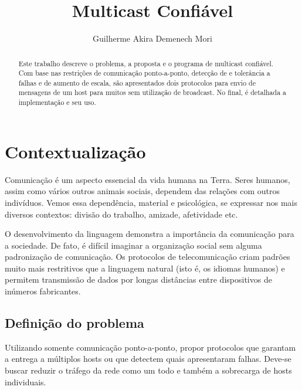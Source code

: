 \documentclass[12pt,twocolumn]{article}
\title{Multicast Confiável}
\author{Guilherme Akira Demenech Mori}
\begin{document}
	
	
	
		
		\maketitle	
	
		\begin{abstract}
			
			Este trabalho descreve o problema, a proposta e o programa de multicast confiável.
			Com base nas restrições de comunicação ponto-a-ponto, detecção de e tolerância a falhas e de aumento de escala, são apresentados dois protocolos para envio de mensagens de um host para muitos sem utilização de broadcast.
			No final, é detalhada a implementação e seu uso.
		\end{abstract}
	
		\tableofcontents
		
		\listoffigures
	

	
		\section*{Contextualização}
			Comunicação é um aspecto essencial da vida humana na Terra.
			Seres humanos, assim como vários outros animais sociais, dependem das relações com outros indivíduos.
			Vemos essa dependência, material e psicológica, se expressar nos mais diversos contextos: divisão do trabalho, amizade, afetividade etc.  
			
			O desenvolvimento da linguagem demonstra a importância da comunicação para a sociedade.
			De fato, é difícil imaginar a organização social sem alguma padronização de comunicação.
			Os protocolos de telecomunicação criam padrões muito mais restritivos que a linguagem natural (isto é, os idiomas humanos) e permitem transmissão de dados por longas distâncias entre dispositivos de inúmeros fabricantes.						  
	
			\subsection{Definição do problema}
				Utilizando somente comunicação ponto-a-ponto, propor protocolos que garantam a entrega a múltiplos hosts ou que detectem quais apresentaram falhas.  		
				Deve-se buscar reduzir o tráfego da rede como um todo e também a sobrecarga de hosts individuais.
				
\end{document}
